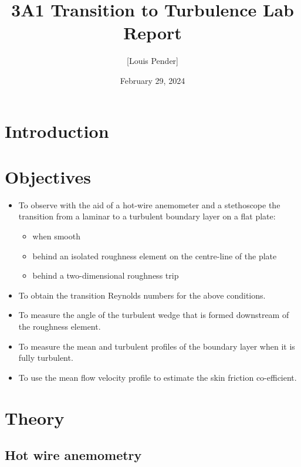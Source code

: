 \documentclass{article}
\title{3A1 Transition to Turbulence Lab Report}
\author{[Louis Pender]}
\date{February 29, 2024}
\begin{document}
\maketitle

\section{Introduction}


\section{Objectives}

\begin{itemize}
    \item To observe with the aid of a hot-wire anemometer and a stethoscope the transition
    from a laminar to a turbulent boundary layer on a flat plate:
    \begin{itemize}
        \item when smooth
        \item behind an isolated roughness element on the centre-line of the plate
        \item behind a two-dimensional roughness trip
    \end{itemize}

    \item To obtain the transition Reynolds numbers for the above conditions.
    \item To measure the angle of the turbulent wedge that is formed downstream of the roughness element.
    \item To measure the mean and turbulent profiles of the boundary layer when it is fully turbulent.
    \item To use the mean flow velocity profile to estimate the skin friction co-efficient. %
\end{itemize}


\section{Theory}

\subsection{Hot wire anemometry}
\end{document}
